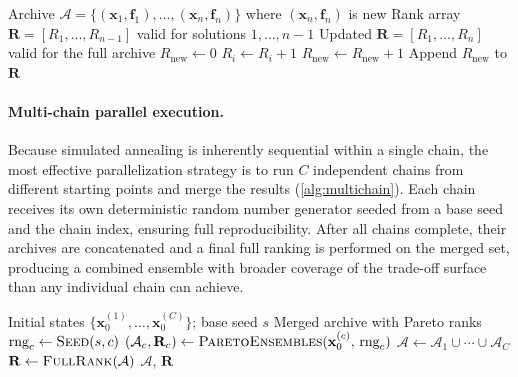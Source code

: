 \documentclass[12pt]{article}
\begin{document}
\begin{algorithm}[H]
\caption{\textsc{RankInsert}$(\mathcal{A}, \mathbf{R})$: Incremental rank update after appending one solution}\label{alg:rankinsert}
\begin{algorithmic}[1]
\Require Archive $\mathcal{A} = \{(\mathbf{x}_1, \mathbf{f}_1), \ldots, (\mathbf{x}_n, \mathbf{f}_n)\}$ where $(\mathbf{x}_n, \mathbf{f}_n)$ is new
\Require Rank array $\mathbf{R} = [R_1, \ldots, R_{n-1}]$ valid for solutions $1, \ldots, n{-}1$
\Ensure Updated $\mathbf{R} = [R_1, \ldots, R_n]$ valid for the full archive
\State $R_{\text{new}} \gets 0$
    \State $R_i \gets R_i + 1$
  \EndIf
    \State $R_{\text{new}} \gets R_{\text{new}} + 1$
  \EndIf
\EndFor
\State Append $R_{\text{new}}$ to $\mathbf{R}$
\end{algorithmic}
\end{algorithm}

\paragraph{Multi-chain parallel execution.}
Because simulated annealing is inherently sequential within a single chain, the most effective parallelization strategy is to run $C$ independent chains from different starting points and merge the results (\cref{alg:multichain}).
Each chain receives its own deterministic random number generator seeded from a base seed and the chain index, ensuring full reproducibility.
After all chains complete, their archives are concatenated and a final full ranking is performed on the merged set, producing a combined ensemble with broader coverage of the trade-off surface than any individual chain can achieve.

\begin{algorithm}[H]
\caption{\textsc{ParetoEnsemblesParallel}: Multi-chain parallel execution}\label{alg:multichain}
\begin{algorithmic}[1]
\Require Initial states $\{\mathbf{x}_0^{(1)}, \ldots, \mathbf{x}_0^{(C)}\}$; base seed $s$
\Ensure Merged archive with Pareto ranks
  \State $\text{rng}_c \gets \textsc{Seed}(s, c)$
  \State $(\mathcal{A}_c, \mathbf{R}_c) \gets \textsc{ParetoEnsembles}(\mathbf{x}_0^{(c)},\, \text{rng}_c)$
\EndFor
\State $\mathcal{A} \gets \mathcal{A}_1 \cup \cdots \cup \mathcal{A}_C$
\State $\mathbf{R} \gets \textsc{FullRank}(\mathcal{A})$
\State \Return $\mathcal{A},\, \mathbf{R}$
\end{algorithmic}
\end{algorithm}
\end{document}
